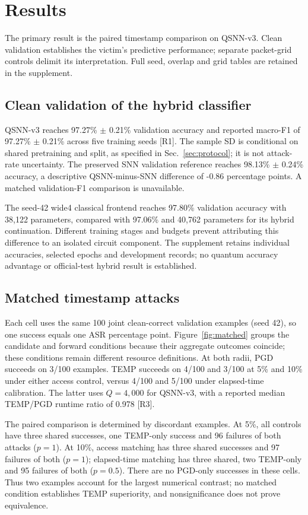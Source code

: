 \section{Results}\label{sec:results}
The primary result is the paired timestamp comparison on QSNN-v3. Clean validation establishes the victim's predictive performance; separate packet-grid controls delimit its interpretation. Full seed, overlap and grid tables are retained in the supplement.

\subsection{Clean validation of the hybrid classifier}
QSNN-v3 reaches 97.27\% $\pm$ 0.21\% validation accuracy and reported macro-F1 of 97.27\% $\pm$ 0.21\% across five training seeds [R1]. The sample SD is conditional on shared pretraining and split, as specified in Sec.~\ref{sec:protocol}; it is not attack-rate uncertainty. The preserved SNN validation reference reaches 98.13\% $\pm$ 0.24\% accuracy, a descriptive QSNN-minus-SNN difference of -0.86 percentage points. A matched validation-F1 comparison is unavailable.

The seed-42 wide4 classical frontend reaches 97.80\% validation accuracy with 38,122 parameters, compared with 97.06\% and 40,762 parameters for its hybrid continuation. Different training stages and budgets prevent attributing this difference to an isolated circuit component. The supplement retains individual accuracies, selected epochs and development records; no quantum accuracy advantage or official-test hybrid result is established.

\subsection{Matched timestamp attacks}
Each cell uses the same 100 joint clean-correct validation examples (seed 42), so one success equals one ASR percentage point. Figure~\ref{fig:matched} groups the candidate and forward conditions because their aggregate outcomes coincide; these conditions remain different resource definitions. At both radii, PGD succeeds on 3/100 examples. TEMP succeeds on 4/100 and 3/100 at 5\% and 10\% under either access control, versus 4/100 and 5/100 under elapsed-time calibration. The latter uses $Q=4{,}000$ for QSNN-v3, with a reported median TEMP/PGD runtime ratio of 0.978 [R3].

The paired comparison is determined by discordant examples. At 5\%, all controls have three shared successes, one TEMP-only success and 96 failures of both attacks ($p=1$). At 10\%, access matching has three shared successes and 97 failures of both ($p=1$); elapsed-time matching has three shared, two TEMP-only and 95 failures of both ($p=0.5$). There are no PGD-only successes in these cells. Thus two examples account for the largest numerical contrast; no matched condition establishes TEMP superiority, and nonsignificance does not prove equivalence.

